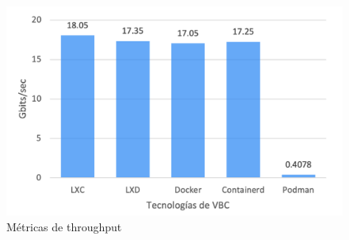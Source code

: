 \begin{figure}[H]
    \centering
    \includegraphics[width=\textwidth] {tablas-images/cp4/THROUGHTPUT.png}
    \caption{Métricas de throughput}\label{fig:tabla-metricas-throughput}
\end{figure}